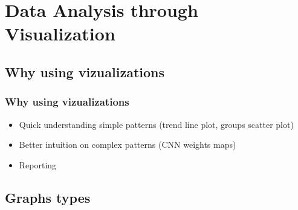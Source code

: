 



\begin{frame}
   \titlepage
\end{frame}



\begin{frame}
   \tableofcontents
\end{frame}

\section{Data Analysis through Visualization}


\subsection{Why using vizualizations}

\begin{frame}\frametitle{Why using vizualizations}
   \begin{itemize}
      \item Quick understanding simple patterns (trend line plot, groups scatter plot)
      \item Better intuition on complex patterns (CNN weights maps)
      \item Reporting
   \end{itemize}
\end{frame}

\subsection{Graphs types}

